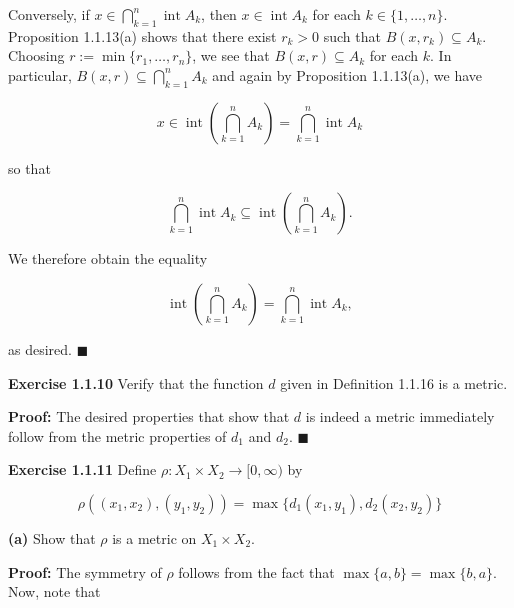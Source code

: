 \documentclass{article}
\DeclareMathOperator{\interior}{int}
\begin{document}
Conversely, if $x\in \bigcap_{k=1}^n \interior A_k$, then $x\in \interior A_k$ for each $k\in \{1,\dots,n\}.$ Proposition 1.1.13(a) shows that there exist $r_k>0$ such that $B(x,r_k)\subseteq A_k$. Choosing $r:=\min \{r_1,\dots ,r_n\}$, we see that $B(x,r)\subseteq A_k$ for each $k$. In particular, $B(x,r)\subseteq \bigcap_{k=1}^{n}A_k$ and again by Proposition 1.1.13(a), we have 

\begin{equation*}
    x\in \interior \left(\bigcap_{k=1}^{n}A_k\right)=\bigcap_{k=1}^n \interior A_k
\end{equation*}

so that

\begin{equation*}
   \bigcap_{k=1}^n \interior A_k\subseteq\interior \left(\bigcap_{k=1}^{n}A_k\right).
\end{equation*}

We therefore obtain the equality 

\begin{equation*}
    \interior \left(\bigcap_{k=1}^{n}A_k\right)=\bigcap_{k=1}^n \interior A_k,
\end{equation*}

as desired. $\blacksquare$

\begin{tcolorbox}
    \textbf{Exercise 1.1.10} Verify that the function $d$ given in Definition 1.1.16 is a metric.
\end{tcolorbox}

\textbf{Proof:} The desired properties that show that $d$ is indeed a metric immediately follow from the metric properties of $d_1$ and $d_2$. $\blacksquare$

\begin{tcolorbox}
    \textbf{Exercise 1.1.11} Define $\rho : X_1\times X_2\to [0,\infty)$ by 

    \begin{equation*}
        \rho((x_1,x_2),(y_1,y_2))=\max \{d_1(x_1,y_1),d_2(x_2,y_2)\}
    \end{equation*}
\end{tcolorbox}

\begin{tcolorbox}
    \textbf{(a)} Show that $\rho$ is a metric on $X_1\times X_2$.
\end{tcolorbox}

\textbf{Proof:} The symmetry of $\rho$ follows from the fact that $\max \{a,b\}=\max \{b,a\}$. Now, note that 
\end{document}
